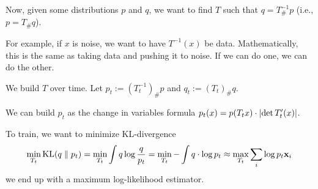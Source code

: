 \documentclass[notes]{agony}
\newcommand{\x}{\vb{x}}
\DeclareMathOperator{\KL}{KL}
\begin{document}
Now, given some distributions $p$ and $q$,
we want to find $T$ such that $q = T_\#^{-1}p$
(i.e., $p = T_\#q$).

For example, if $x$ is noise, we want to have $T^{-1}(x)$ be data.
Mathematically, this is the same as taking data and pushing it to noise.
If we can do one, we can do the other.

We build $T$ over time.
Let $p_t := (T_t^{-1})_\# p$ and $q_t := (T_t)_\#q$.

We can build $p_t$ as the change in variables formula
$p_t(x) = p(T_t x) \cdot \abs{\det T_t'(x)}$.

To train, we want to minimize KL-divergence
\begin{align*}
	\min_{T_t} \KL(q \parallel p_t) = \min_{T_t} \int q \log\frac{q}{p_t}
	= \min_{T_t} -\int q \cdot \log p_t \approx \max_{T_t} \sum_i \log p_t \x_i
\end{align*}
we end up with a maximum log-likelihood estimator.
\end{document}
